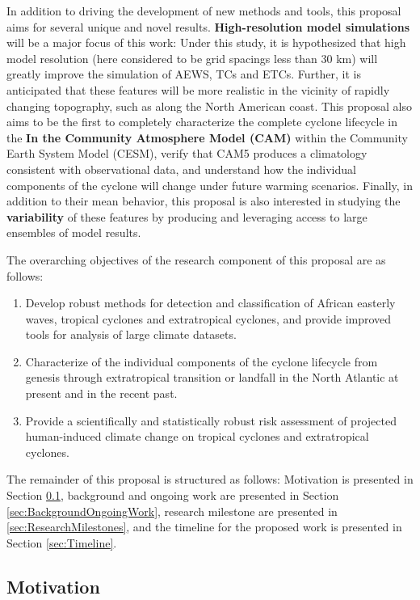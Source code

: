 \documentclass[11pt]{article}
\begin{document}
In addition to driving the development of new methods and tools, this proposal aims for several unique and novel results.  \textbf{High-resolution model simulations} will be a major focus of this work:  Under this study, it is hypothesized that high model resolution (here considered to be grid spacings less than 30 km) will greatly improve the simulation of AEWS, TCs and ETCs.  Further, it is anticipated that these features will be more realistic in the vicinity of rapidly changing topography, such as along the North American coast.  This proposal also aims to be the first to completely characterize the complete cyclone lifecycle in the \textbf{In the Community Atmosphere Model (CAM)} within the Community Earth System Model (CESM), verify that CAM5 produces a climatology consistent with observational data, and understand how the individual components of the cyclone will change under future warming scenarios.  Finally, in addition to their mean behavior, this proposal is also interested in studying the \textbf{variability} of these features by producing and leveraging access to large ensembles of model results.

The overarching objectives of the research component of this proposal are as follows: 

\begin{enumerate}
\item Develop robust methods for detection and classification of African easterly waves, tropical cyclones and extratropical cyclones, and provide improved tools for analysis of large climate datasets.

\item Characterize of the individual components of the cyclone lifecycle from genesis through extratropical transition or landfall in the North Atlantic at present and in the recent past.

\item Provide a scientifically and statistically robust risk assessment of projected human-induced climate change on tropical cyclones and extratropical cyclones.
\end{enumerate}

The remainder of this proposal is structured as follows: Motivation is presented in Section \ref{sec:Motivation}, background and ongoing work are presented in Section \ref{sec:BackgroundOngoingWork}, research milestone are presented in \ref{sec:ResearchMilestones}, and the timeline for the proposed work is presented in Section \ref{sec:Timeline}.

\subsection{Motivation} \label{sec:Motivation}
\end{document}
